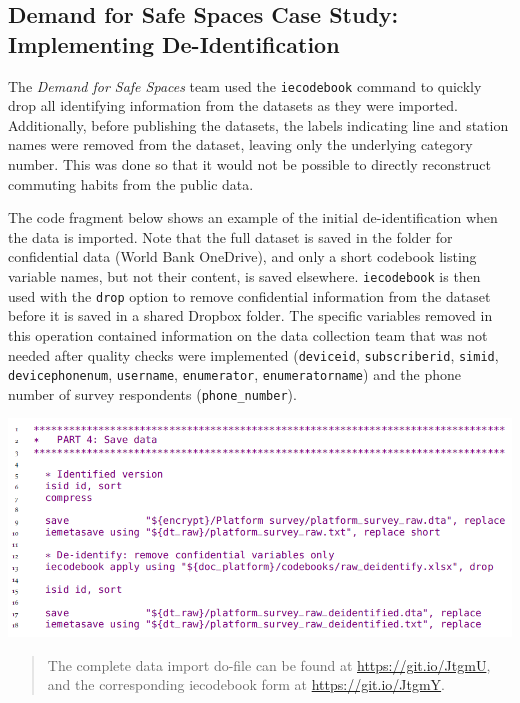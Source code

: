 \documentclass[
]{book}
\begin{document}
\begin{ex}
\hypertarget{demand-for-safe-spaces-case-study-implementing-de-identification}{%
\subsection{Demand for Safe Spaces Case Study: Implementing De-Identification}\label{demand-for-safe-spaces-case-study-implementing-de-identification}}

The \emph{Demand for Safe Spaces} team used the \texttt{iecodebook} command to quickly drop all identifying information from the datasets as they were imported. Additionally, before publishing the datasets, the labels indicating line and station names were removed from the dataset, leaving only the underlying category number. This was done so that it would not be possible to directly reconstruct commuting habits from the public data.

The code fragment below shows an example of the initial de-identification when the data is imported. Note that the full dataset is saved in the folder for confidential data (World Bank OneDrive), and only a short codebook listing variable names, but not their content, is saved elsewhere. \texttt{iecodebook} is then used with the \texttt{drop} option to remove confidential information from the dataset before it is saved in a shared Dropbox folder. The specific variables removed in this operation contained information on the data collection team that was not needed after quality checks were implemented (\texttt{deviceid}, \texttt{subscriberid}, \texttt{simid}, \texttt{devicephonenum}, \texttt{username}, \texttt{enumerator}, \texttt{enumeratorname}) and the phone number of survey respondents (\texttt{phone\_number}).

\includegraphics{examples/ch5-implementing-de-identification.png}

\begin{quote}
The complete data import do-file can be found at \url{https://git.io/JtgmU}, and the corresponding iecodebook form at \url{https://git.io/JtgmY}.
\end{quote}
\end{ex}
\end{document}
